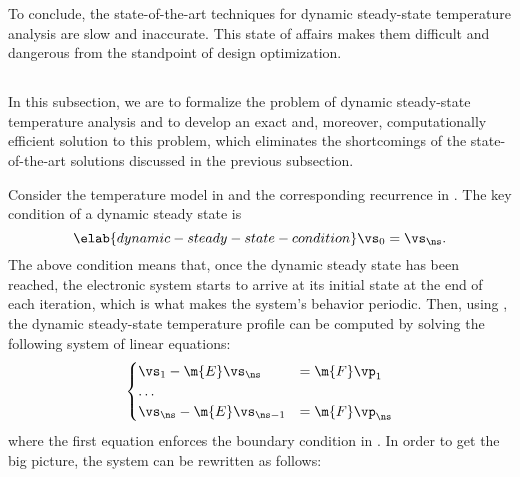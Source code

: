 To conclude, the state-of-the-art techniques for dynamic steady-state
temperature analysis are slow and inaccurate. This state of affairs makes them
difficult and dangerous from the standpoint of design optimization.

\subsection{\solutiontitle}

In this subsection, we are to formalize the problem of dynamic steady-state
temperature analysis and to develop an exact and, moreover, computationally
efficient solution to this problem, which eliminates the shortcomings of the
state-of-the-art solutions discussed in the previous subsection.

Consider the temperature model in  and the corresponding
recurrence in . The key condition of a dynamic
steady state is
\begin{equation} \elab{dynamic-steady-state-condition}
  \vs_0 = \vs_\ns.
\end{equation}
The above condition means that, once the dynamic steady state has been reached,
the electronic system starts to arrive at its initial state at the end of each
iteration, which is what makes the system's behavior periodic. Then, using
, the dynamic steady-state temperature profile
can be computed by solving the following system of linear equations:
\[
  \begin{cases}
    \vs_1 - \m{E} \vs_\ns & = \m{F} \vp_1 \\
    \dots \\
    \vs_\ns - \m{E} \vs_{\ns - 1} & = \m{F} \vp_\ns
  \end{cases}
\]
where the first equation enforces the boundary condition in
. In order to get the big picture, the
system can be rewritten as follows:
